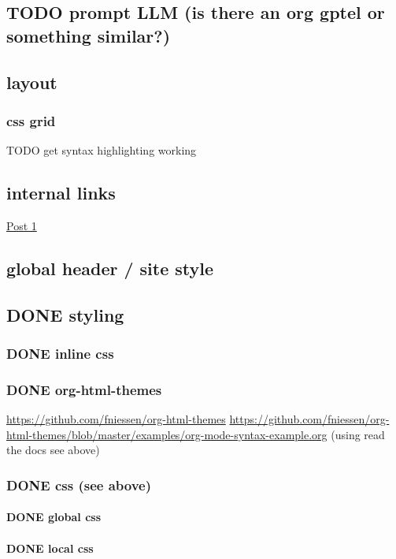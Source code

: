 \documentclass[11pt]{article}
\begin{document}
\subsection{{\bfseries\sffamily TODO} prompt LLM (is there an org gptel or something similar?)}
\label{sec:orgf147185}
\subsection{layout}
\label{sec:org250d94a}

\subsubsection{css grid}
\label{sec:org21bb650}
TODO get syntax highlighting working
\subsection{internal links}
\label{sec:orgb49f8d2}
\href{post1.html}{Post 1}
\subsection{global header / site style}
\label{sec:orgd5f68b8}
\subsection{{\bfseries\sffamily DONE} styling}
\label{sec:org17e41a6}
\subsubsection{{\bfseries\sffamily DONE} inline css}
\label{sec:org90276ef}
\subsubsection{{\bfseries\sffamily DONE} org-html-themes}
\label{sec:orgf619c51}
\url{https://github.com/fniessen/org-html-themes}
\url{https://github.com/fniessen/org-html-themes/blob/master/examples/org-mode-syntax-example.org}
(using read the docs see above)
\subsubsection{{\bfseries\sffamily DONE} css (see above)}
\label{sec:orgbcc38d3}
\paragraph{{\bfseries\sffamily DONE} global css}
\label{sec:org4c2be41}
\paragraph{{\bfseries\sffamily DONE} local css}
\label{sec:org789a04f}
\end{document}
